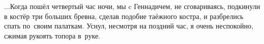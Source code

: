 





$\ldots$Когда пошёл четвертый час ночи, мы c Геннадичем, не сговариваясь, подкинули в костёр три больших бревна, сделав подобие таёжного костра, и разбрелись спать по~своим палаткам. Уснул, несмотря на поздний час, я очень неспокойно, сжимая рукоять топора в~руке. 

\begin{center}
\end{center}
